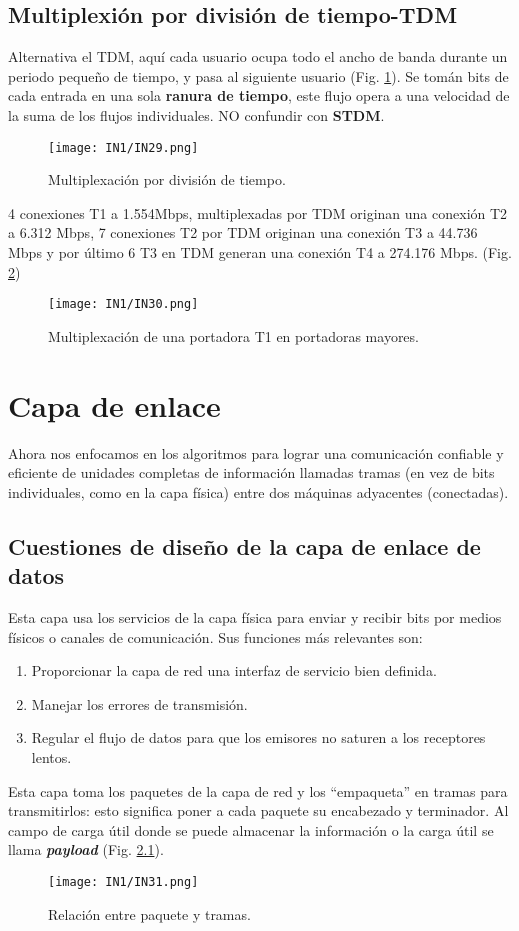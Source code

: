 \documentclass[
	12pt, %
	fleqn, %
	a4paper, %
]{LegrandOrangeBook}
\begin{document}
\section{Multiplexión por división de tiempo-TDM}
Alternativa el TDM, aquí cada usuario ocupa todo el ancho de banda durante un periodo pequeño de tiempo, y pasa al siguiente usuario (Fig. \ref{fig: tdm}). Se tomán bits de cada entrada en una sola \textbf{ranura de tiempo}, este flujo opera a una velocidad de la suma de los flujos individuales. NO confundir con \textbf{STDM}.
\begin{figure}[]
\centering
\texttt{[image: IN1/IN29.png]}
\caption{Multiplexación por división de tiempo.}
\label{fig: tdm}
\end{figure}
4 conexiones T1 a 1.554Mbps, multiplexadas por TDM originan una conexión T2 a 6.312 Mbps, 7 conexiones T2 por TDM originan una conexión T3 a 44.736 Mbps y por último 6 T3 en TDM generan una conexión T4 a 274.176 Mbps. (Fig. \ref{fig: t1 carrier})
\begin{figure}[]
\centering
\texttt{[image: IN1/IN30.png]}
\caption{Multiplexación de una portadora T1 en portadoras mayores.}
\label{fig: t1 carrier}
\end{figure}
\chapter{Capa de enlace}
Ahora nos enfocamos en los algoritmos para lograr una comunicación confiable y eficiente de unidades completas de información llamadas tramas (en vez de bits individuales, como en la capa física) entre dos máquinas adyacentes (conectadas).
\section{Cuestiones de diseño de la capa de enlace de datos}
Esta capa usa los servicios de la capa física para enviar y recibir bits por medios físicos o canales de comunicación. Sus funciones más relevantes son:
\begin{enumerate}
\item Proporcionar  la capa de red una interfaz de servicio bien definida.
\item Manejar los errores de transmisión.
\item Regular el flujo de datos para que los emisores no saturen a los receptores lentos.
\end{enumerate}
Esta capa toma los paquetes de la capa de red y los ``empaqueta'' en tramas para transmitirlos: esto significa poner a cada paquete su encabezado y terminador. Al campo de carga útil donde se puede almacenar la información o la carga útil se llama \textbf{\textit{payload}} (Fig. \ref{fig: paquete y trama}).
\begin{figure}[]
\centering
\texttt{[image: IN1/IN31.png]}
\caption{Relación entre paquete y tramas.}
\label{fig: paquete y trama}
\end{figure}
\end{document}
